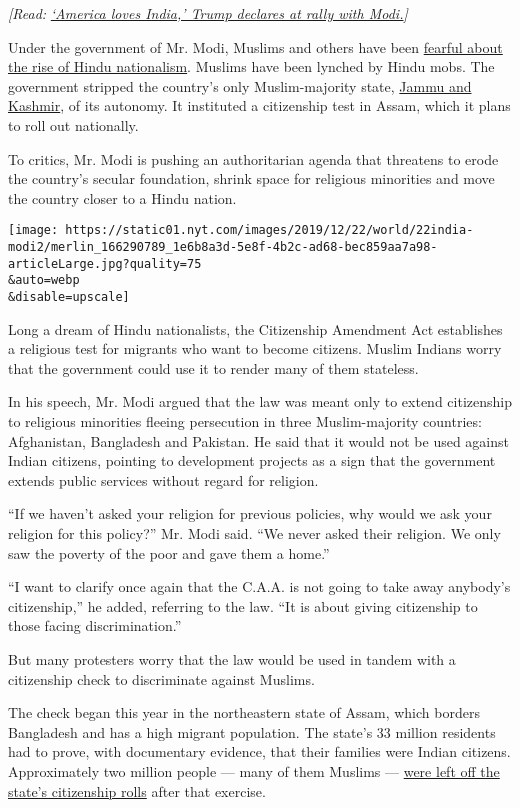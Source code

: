 \emph{{[}Read:}
\href{https://www.nytimes.com/2020/02/24/world/asia/trump-india-modi.html?}{\emph{`America
loves India,' Trump declares at rally with Modi.}}\emph{{]}}

Under the government of Mr. Modi, Muslims and others have been
\href{https://www.nytimes.com/2019/12/16/world/asia/india-citizenship-protests.html}{fearful
about the rise of Hindu nationalism}. Muslims have been lynched by Hindu
mobs. The government stripped the country's only Muslim-majority state,
\href{https://www.nytimes.com/2019/08/05/world/asia/india-pakistan-kashmir-jammu.html}{Jammu
and Kashmir}, of its autonomy. It instituted a citizenship test in
Assam, which it plans to roll out nationally.

To critics, Mr. Modi is pushing an authoritarian agenda that threatens
to erode the country's secular foundation, shrink space for religious
minorities and move the country closer to a Hindu nation.

\texttt{[image: https://static01.nyt.com/images/2019/12/22/world/22india-modi2/merlin\_166290789\_1e6b8a3d-5e8f-4b2c-ad68-bec859aa7a98-articleLarge.jpg?quality=75\\\&auto=webp\\\&disable=upscale]}

Long a dream of Hindu nationalists, the Citizenship Amendment Act
establishes a religious test for migrants who want to become citizens.
Muslim Indians worry that the government could use it to render many of
them stateless.

In his speech, Mr. Modi argued that the law was meant only to extend
citizenship to religious minorities fleeing persecution in three
Muslim-majority countries: Afghanistan, Bangladesh and Pakistan. He said
that it would not be used against Indian citizens, pointing to
development projects as a sign that the government extends public
services without regard for religion.

``If we haven't asked your religion for previous policies, why would we
ask your religion for this policy?'' Mr. Modi said. ``We never asked
their religion. We only saw the poverty of the poor and gave them a
home.''

``I want to clarify once again that the C.A.A. is not going to take away
anybody's citizenship,'' he added, referring to the law. ``It is about
giving citizenship to those facing discrimination.''

But many protesters worry that the law would be used in tandem with a
citizenship check to discriminate against Muslims.

The check began this year in the northeastern state of Assam, which
borders Bangladesh and has a high migrant population. The state's 33
million residents had to prove, with documentary evidence, that their
families were Indian citizens. Approximately two million people --- many
of them Muslims ---
\href{https://www.nytimes.com/2019/08/31/world/asia/india-muslim-citizen-list.html}{were
left off the state's citizenship rolls} after that exercise.

